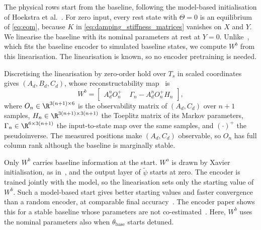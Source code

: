 The physical rows start from the baseline, following the model-based
initialisation of Hoekstra et al.~\cite[Sec.~3.1]{hoekstra2026encoder}.
For zero input, every rest state with $\Theta=0$ is an equilibrium of
\eqref{eq:eom}, because $K$ in \eqref{eq:damping_stiffness_matrices} vanishes
on $X$ and $Y$.
We linearise the baseline with its nominal parameters at rest at $Y=0$.
Unlike~\cite[Eq.~(30)]{hoekstra2026lfr}, which fits the baseline encoder to
simulated baseline states, we compute $W^b$ from this linearisation.
The linearisation is known, so no encoder pretraining is needed.

Discretising the linearisation by zero-order hold over $T_s$ in scaled
coordinates gives $(A_d,B_d,C_d)$, whose reconstructability
map~\cite[Eqs.~(15) to (17)]{hoekstra2026encoder} is
\begin{equation}
 W^b=\begin{bmatrix}
  A_d^nO_n^{+} & \;\Gamma_n-A_d^nO_n^{+}H_n
 \end{bmatrix},
 \label{eq:aug_wb}
\end{equation}
where $O_n\in\R^{3(n+1)\times6}$ is the observability matrix of $(A_d,C_d)$
over $n+1$ samples, $H_n\in\R^{3(n+1)\times3(n+1)}$ the Toeplitz matrix of its
Markov parameters, $\Gamma_n\in\R^{6\times3(n+1)}$ the input-to-state map over the
same samples, and $(\cdot)^+$ the pseudoinverse.
The measured positions make $(A_d,C_d)$ observable, so $O_n$ has full column
rank although the baseline is marginally stable.

Only $W^b$ carries baseline information at the start.
$W^a$ is drawn by Xavier initialisation, as
in~\cite[Eq.~(31)]{hoekstra2026lfr}, and the output layer of $\tilde\psi$
starts at zero.
The encoder is trained jointly with the model, so the linearisation sets only
the starting value of $W^b$.
Such a model-based start gives better starting values and faster convergence
than a random encoder, at comparable final
accuracy~\cite[Sec.~4.4]{hoekstra2026encoder}.
The encoder paper shows this for a stable baseline whose parameters are not
co-estimated~\cite[Sec.~2, footnote~1]{hoekstra2026encoder}.
Here, $W^b$ uses the nominal parameters also when $\theta_{\mathrm{base}}$
starts detuned.

